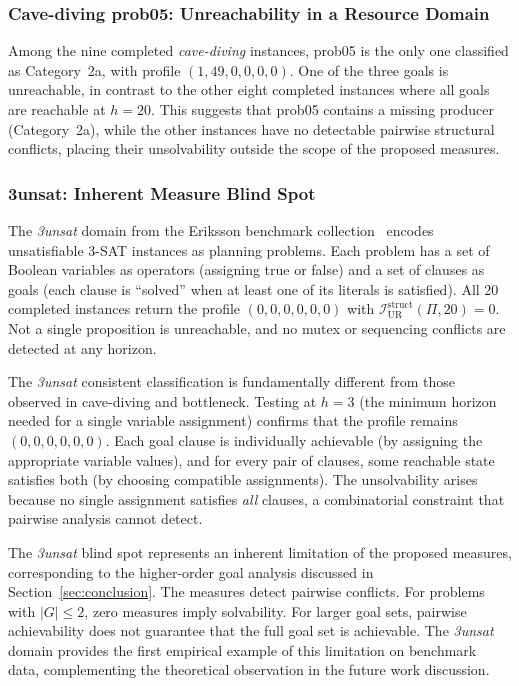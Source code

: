 \subsubsection{Cave-diving prob05: Unreachability in a Resource Domain}

Among the nine completed \textit{cave-diving} instances, prob05 is the only one classified as Category~2a, with profile $(1, 49, 0, 0, 0, 0)$. One of the three goals is unreachable, in contrast to the other eight completed instances where all goals are reachable at $h = 20$. This suggests that prob05 contains a missing producer (Category~2a), while the other instances have no detectable pairwise structural conflicts, placing their unsolvability outside the scope of the proposed measures.

\subsubsection{3unsat: Inherent Measure Blind Spot}
\label{sec:3unsat_case_study}

The \textit{3unsat} domain from the Eriksson benchmark collection~\cite{Eriksson2019} encodes unsatisfiable 3-SAT instances as planning problems. Each problem has a set of Boolean variables as operators (assigning true or false) and a set of clauses as goals (each clause is ``solved'' when at least one of its literals is satisfied). All 20 completed instances return the profile $(0, 0, 0, 0, 0, 0)$ with $\mathcal{I}^{\text{struct}}_{\text{UR}}(\Pi, 20) = 0$. Not a single proposition is unreachable, and no mutex or sequencing conflicts are detected at any horizon.

The \textit{3unsat} consistent classification is fundamentally different from those observed in cave-diving and bottleneck. Testing at $h = 3$ (the minimum horizon needed for a single variable assignment) confirms that the profile remains $(0, 0, 0, 0, 0, 0)$. Each goal clause is individually achievable (by assigning the appropriate variable values), and for every pair of clauses, some reachable state satisfies both (by choosing compatible assignments). The unsolvability arises because no single assignment satisfies \emph{all} clauses, a combinatorial constraint that pairwise analysis cannot detect.

The \textit{3unsat} blind spot represents an inherent limitation of the proposed measures, corresponding to the higher-order goal analysis discussed in Section~\ref{sec:conclusion}. The measures detect pairwise conflicts. For problems with $|G| \leq 2$, zero measures imply solvability. For larger goal sets, pairwise achievability does not guarantee that the full goal set is achievable. The \textit{3unsat} domain provides the first empirical example of this limitation on benchmark data, complementing the theoretical observation in the future work discussion.

